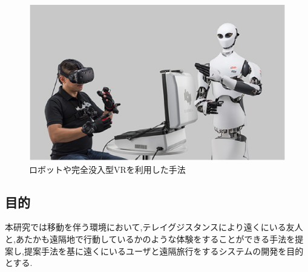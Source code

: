 \begin{figure}[htbp]
\begin{center}
\includegraphics[width=16cm]{img/01_background/robovr.eps} 
\end{center}
\caption{ロボットや完全没入型VRを利用した手法}
\label{figure:vrmodel}
\end{figure} 

\clearpage

\subsection{目的}
本研究では移動を伴う環境において,テレイグジスタンスにより遠くにいる友人と,あたかも遠隔地で行動しているかのような体験をすることができる手法を提案し,提案手法を基に遠くにいるユーザと遠隔旅行をするシステムの開発を目的とする.




